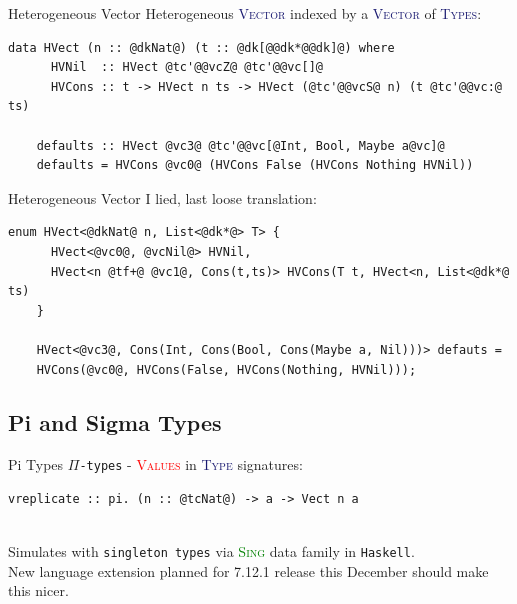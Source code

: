 \documentclass[xcolor={usenames,dvipsnames}]{beamer}
\newcommand{\htycon}[1]{\textcolor{MidnightBlue}{\textsc{#1}}}
\newcommand{\hvalcon}[1]{\textcolor{Red}{\textsc{#1}}}
\newcommand{\htyfam}[1]{\textcolor{Green}{\textsc{#1}}}
\begin{document}
\begin{frame}[fragile]{Heterogeneous Vector}
  Heterogeneous \htycon{Vector} indexed by a \htycon{Vector} of \htycon{Types}:
  \begin{lstlisting}[style=hask]
    data HVect (n :: @dkNat@) (t :: @dk[@@dk*@@dk]@) where
      HVNil  :: HVect @tc'@@vcZ@ @tc'@@vc[]@
      HVCons :: t -> HVect n ts -> HVect (@tc'@@vcS@ n) (t @tc'@@vc:@ ts)

    defaults :: HVect @vc3@ @tc'@@vc[@Int, Bool, Maybe a@vc]@
    defaults = HVCons @vc0@ (HVCons False (HVCons Nothing HVNil))
  \end{lstlisting}
\end{frame}

\begin{frame}[fragile]{Heterogeneous Vector}
  I lied, last loose translation:
  \begin{lstlisting}[style=hask]
    enum HVect<@dkNat@ n, List<@dk*@> T> {
      HVect<@vc0@, @vcNil@> HVNil,
      HVect<n @tf+@ @vc1@, Cons(t,ts)> HVCons(T t, HVect<n, List<@dk*@ ts)
    }

    HVect<@vc3@, Cons(Int, Cons(Bool, Cons(Maybe a, Nil)))> defauts =
    HVCons(@vc0@, HVCons(False, HVCons(Nothing, HVNil)));
  \end{lstlisting}
\end{frame}


\subsection{Pi and Sigma Types}

\begin{frame}[fragile]{Pi Types}
  \texttt{$\Pi$-types} - \hvalcon{Values} in \htycon{Type} signatures:
  \begin{lstlisting}[style=hask]
    vreplicate :: pi. (n :: @tcNat@) -> a -> Vect n a
  \end{lstlisting}

  \ \\
  \pause
  Simulates with \texttt{singleton types} via \htyfam{Sing} data family in \texttt{Haskell}.\\
  New language extension planned for 7.12.1 release this December should make this nicer.
\end{frame}
\end{document}
